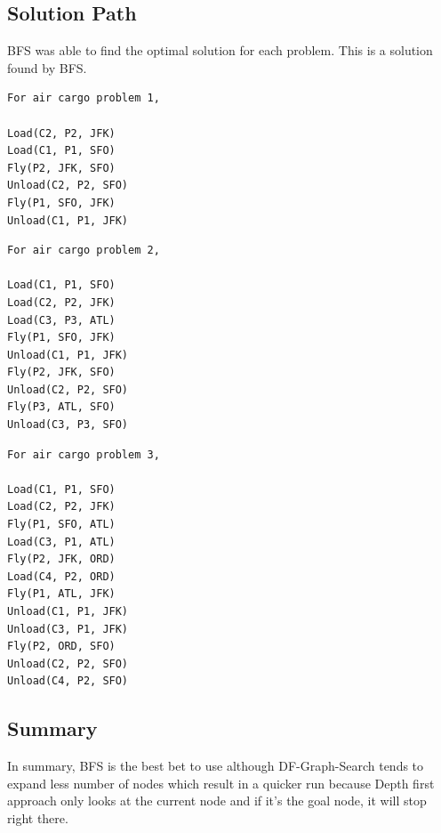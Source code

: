 \documentclass[letterpaper]{article}
\begin{document}
\subsection*{Solution Path}
BFS was able to find the optimal solution for each problem. This is a solution found by BFS. 
\begin{multicols}{3}

\begin{verbatim}
For air cargo problem 1,

Load(C2, P2, JFK) 
Load(C1, P1, SFO) 
Fly(P2, JFK, SFO)  
Unload(C2, P2, SFO) 
Fly(P1, SFO, JFK) 
Unload(C1, P1, JFK) 
\end{verbatim}
\columnbreak

\begin{verbatim}
For air cargo problem 2, 

Load(C1, P1, SFO) 
Load(C2, P2, JFK)  
Load(C3, P3, ATL) 
Fly(P1, SFO, JFK) 
Unload(C1, P1, JFK) 
Fly(P2, JFK, SFO) 
Unload(C2, P2, SFO) 
Fly(P3, ATL, SFO)  
Unload(C3, P3, SFO) 
\end{verbatim}
\columnbreak

\begin{verbatim}
For air cargo problem 3, 

Load(C1, P1, SFO)
Load(C2, P2, JFK)
Fly(P1, SFO, ATL)
Load(C3, P1, ATL)
Fly(P2, JFK, ORD)
Load(C4, P2, ORD)
Fly(P1, ATL, JFK)
Unload(C1, P1, JFK)
Unload(C3, P1, JFK)
Fly(P2, ORD, SFO)
Unload(C2, P2, SFO)
Unload(C4, P2, SFO)
\end{verbatim} 
\end{multicols}

\subsection*{Summary}
In summary, BFS is the best bet to use although DF-Graph-Search tends to expand less number of nodes which result in a quicker run because Depth first approach only looks at the current node and if it's the goal node, it will stop right there.
\end{document}
